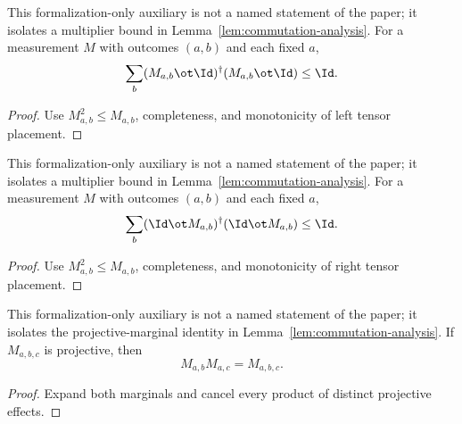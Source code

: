 \begin{lemma}
	\label{lem:distance-left-fiber-contraction}
	\leanok
	This formalization-only auxiliary is not a named statement of the paper; it
	isolates a multiplier bound in Lemma~\ref{lem:commutation-analysis}. For a
	measurement $M$ with outcomes $(a,b)$ and each fixed $a$,
	\[
		\sum_b(M_{a,b}\ot\Id)^\dagger(M_{a,b}\ot\Id)\leq\Id.
	\]
\end{lemma}
\begin{proof}
	\leanok
	Use $M_{a,b}^2\leq M_{a,b}$, completeness, and monotonicity of left tensor
	placement.
\end{proof}

\begin{lemma}
	\label{lem:distance-right-fiber-contraction}
	\leanok
	This formalization-only auxiliary is not a named statement of the paper; it
	isolates a multiplier bound in Lemma~\ref{lem:commutation-analysis}. For a
	measurement $M$ with outcomes $(a,b)$ and each fixed $a$,
	\[
		\sum_b(\Id\ot M_{a,b})^\dagger(\Id\ot M_{a,b})\leq\Id.
	\]
\end{lemma}
\begin{proof}
	\leanok
	Use $M_{a,b}^2\leq M_{a,b}$, completeness, and monotonicity of right tensor
	placement.
\end{proof}

\begin{lemma}
	\label{lem:distance-joint-marginal-product}
	\leanok
	This formalization-only auxiliary is not a named statement of the paper; it
	isolates the projective-marginal identity in
	Lemma~\ref{lem:commutation-analysis}. If $M_{a,b,c}$ is projective, then
	\[
		M_{a,b}M_{a,c}=M_{a,b,c}.
	\]
\end{lemma}
\begin{proof}
	\leanok
	Expand both marginals and cancel every product of distinct projective
	effects.
\end{proof}


